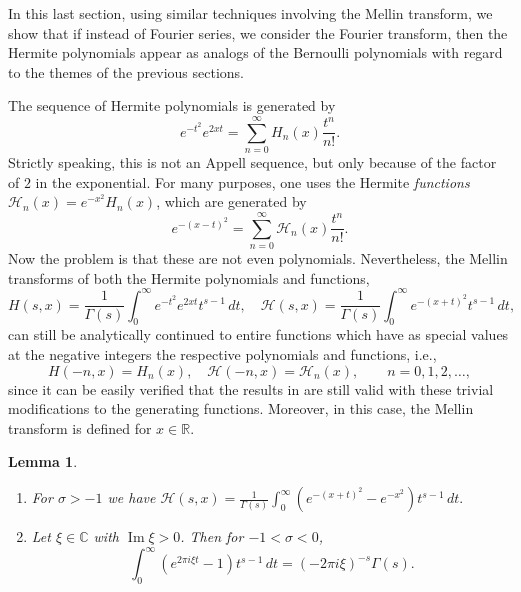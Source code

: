 \documentclass[11pt,a4paper]{amsart}
\newcommand{\R}{\mathbb{R}}
\newcommand{\C}{\mathbb{C}}
\newcommand{\calH}{\mathcal{H}}
\renewcommand{\Im}{\operatorname{Im}}
\theoremstyle{plain}
\theoremstyle{plain}
\theoremstyle{plain}
\newtheorem{lemma}[theorem]{Lemma}
\theoremstyle{remark}
\begin{document}
In this last section, using similar techniques involving the Mellin transform, we show that if instead of Fourier series, we consider the Fourier transform, then the Hermite polynomials appear as analogs of the Bernoulli polynomials with regard to the themes of the previous sections.

The sequence of Hermite polynomials is generated by
\begin{equation*}
  e^{-t^2} e^{2xt} = \sum_{n=0}^\infty H_{n}(x)\frac{t^n}{n!}.
\end{equation*}
Strictly speaking, this is not an Appell sequence, but only because of the factor of $2$ in the exponential. For many purposes, one uses the Hermite \emph{functions} $\calH_{n}(x) = e^{-x^2}H_{n}(x)$, which are generated by
\begin{equation*}
  e^{-(x-t)^2} = \sum_{n=0}^\infty \calH_{n}(x)\frac{t^n}{n!}.
\end{equation*}
Now the problem is that these are not even polynomials. Nevertheless, the Mellin transforms of both the Hermite polynomials and functions,
\[
  H(s,x) = \frac{1}{\Gamma(s)} \int_{0}^{\infty} e^{-t^2}e^{2xt} t^{s-1}\,dt,
  \quad
  \calH(s,x)  = \frac{1}{\Gamma(s)} \int_{0}^{\infty} e^{-(x+t)^2} t^{s-1}\,dt,
\]
can still be analytically continued to entire functions which have as special values at the negative integers the respective polynomials and functions, i.e.,
\[
  H(-n,x) = H_n(x),
  \quad
  \calH(-n,x) = \calH_n(x),
  \qquad n=0,1,2,\dots,
\]
since it can be easily verified that the results in \cite{NRV-values} are still valid with these trivial modifications to the generating functions. Moreover, in this case, the Mellin transform is defined for $x\in\R$.


\begin{lemma}
\label{L:previoFou-Her}
\leavevmode
\begin{enumerate}
\item[(a)]
For $\sigma > -1$ we have
$\displaystyle
\calH(s,x) = \frac{1}{\Gamma(s)} \int_0^\infty \left(e^{-(x+t)^2}-e^{-x^2}\right)t^{s-1}\,dt.
$
\item[(b)] Let $\xi \in \C$ with $\Im \xi > 0$. Then for $-1 < \sigma < 0$,
\[
  \int_0^\infty (e^{2\pi i\xi t}-1)t^{s-1}\,dt = (-2\pi i\xi)^{-s}\Gamma(s).
\]
\end{enumerate}
\end{lemma}
\end{document}
